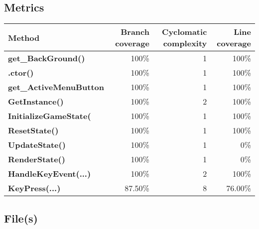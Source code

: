 \documentclass[a4paper,landscape,10pt]{article}
\begin{document}
\subsection{Metrics}
\begin{longtable}[l]{|l|r|r|r|}
\hline
\textbf{Method} & \textbf{Branch coverage} & \textbf{Cyclomatic complexity} & \textbf{Line coverage}\\
\hline
\textbf{get\_BackGround()} & 100\% & 1 & 100\%\\
\hline
\textbf{.ctor()} & 100\% & 1 & 100\%\\
\hline
\textbf{get\_ActiveMenuButton} & 100\% & 1 & 100\%\\
\hline
\textbf{GetInstance()} & 100\% & 2 & 100\%\\
\hline
\textbf{InitializeGameState(} & 100\% & 1 & 100\%\\
\hline
\textbf{ResetState()} & 100\% & 1 & 100\%\\
\hline
\textbf{UpdateState()} & 100\% & 1 & 0\%\\
\hline
\textbf{RenderState()} & 100\% & 1 & 0\%\\
\hline
\textbf{HandleKeyEvent(...)} & 100\% & 2 & 100\%\\
\hline
\textbf{KeyPress(...)} & 87.50\% & 8 & 76.00\%\\
\hline
\end{longtable}
\subsection{File(s)}
\end{document}
